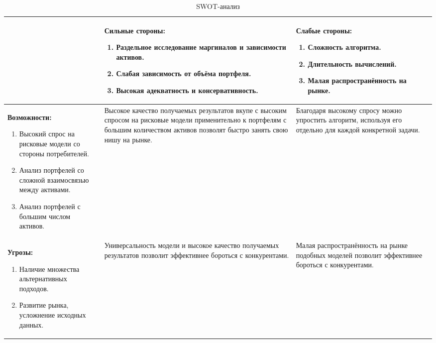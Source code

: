 \begin{table}[tbh!]
\caption{SWOT-анализ}
\label{tab:F:swot}
\centering
\small
\renewcommand\tabularxcolumn[1]{p{#1}}
\begin{tabularx}{\textwidth}
{L|L|L} \toprule
    & \textbf{Сильные стороны:}
    \begin{enumerate}[wide=0pt,labelsep=4pt,after=\vspace{-\baselineskip}]
        \item Раздельное исследование маргиналов и зависимости активов.
        \item Слабая зависимость от объёма портфеля.
        \item Высокая адекватность и консервативность.
    \end{enumerate} & \textbf{Слабые стороны:}
    \begin{enumerate}[wide=0pt,labelsep=4pt,after=\vspace{-\baselineskip}]
        \item Сложность алгоритма.
        \item Длительность вычислений.
        \item Малая распространённость на рынке.
    \end{enumerate} \\
    \midrule
    \textbf{Возможности:}
    \begin{enumerate}[wide=0pt,labelsep=4pt,after=\vspace{-\baselineskip}]
        \item Высокий спрос на рисковые модели со стороны потребителей.
        \item Анализ портфелей со сложной взаимосвязью между активами.
        \item Анализ портфелей с большим числом активов.
    \end{enumerate} 
    & Высокое качество получаемых результатов вкупе с высоким спросом на рисковые модели применительно к портфелям с большим количеством активов позволят быстро занять свою нишу на рынке.
    & Благодаря высокому спросу можно упростить алгоритм, используя его отдельно для каждой конкретной задачи.
    \\ \midrule
    \textbf{Угрозы:}
    \begin{enumerate}[wide=0pt,labelsep=4pt,after=\vspace{-\baselineskip}]
        \item Наличие множества альтернативных подходов.
        \item Развитие рынка, усложнение исходных данных.
    \end{enumerate}
    & Универсальность модели и высокое качество получаемых результатов позволит эффективнее бороться с конкурентами.
    & Малая распространённость на рынке подобных моделей позволит эффективнее бороться с конкурентами.
    \\ \bottomrule
\end{tabularx}
\end{table}

